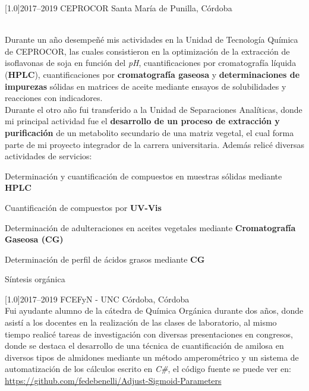 \documentclass[espanol]{cv-style}     %
\begin{document}
\begin{entrylist}
\entry
  {\scalebox{.8}[1.0]{2017--2019}}
  {CEPROCOR}
  {Santa María de Punilla, Córdoba}
  {\\
  Durante un año desempeñé mis actividades en la Unidad de Tecnología Química de CEPROCOR, las cuales consistieron en la optimización de la extracción de isoflavonas de soja en función del \textit{pH}, cuantificaciones por cromatografía líquida (\textbf{HPLC}), cuantificaciones por \textbf{cromatografía gaseosa} y \textbf{determinaciones de impurezas} sólidas en matrices de aceite mediante ensayos de solubilidades y reacciones con indicadores. \\
  Durante el otro año fui transferido a la Unidad de Separaciones Analíticas, donde mi principal actividad fue el \textbf{desarrollo de un proceso de extracción y purificación} de un metabolito secundario de una matriz vegetal, el cual forma parte de mi proyecto integrador de la carrera universitaria.
  Además relicé diversas actividades de servicios:
  \begin{itemize}\small{
  \item Determinación y cuantificación de compuestos en muestras sólidas mediante \textbf{HPLC}
  \item Cuantificación de compuestos por \textbf{UV-Vis}
  \item Determinación de adulteraciones en aceites vegetales mediante \textbf{Cromatografía Gaseosa (CG)}
  \item Determinación de perfil de ácidos grasos mediante \textbf{CG}
  \item Síntesis orgánica
  }
  \end{itemize}
  }

\entry
  {\scalebox{.8}[1.0]{2017--2019}}
  {FCEFyN - UNC}
  {Córdoba, Córdoba}  {\\
	  Fui ayudante alumno de la cátedra de Química Orgánica durante dos años, donde asistí a los docentes en la realización de las clases de laboratorio, al mismo tiempo realicé tareas de investigación con diversas presentaciones en congresos, donde se destaca el desarrollo de una técnica de cuantificación de amilosa en diversos tipos de almidones mediante un método amperométrico y un sistema de automatización de los cálculos escrito en \textit{C\#}, el código fuente se puede ver en: 
	  \url{https://github.com/fedebenelli/Adjust-Sigmoid-Parameters} 
  }

\end{entrylist}

\newpage
\end{document}
